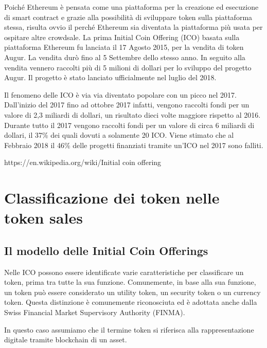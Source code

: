 Poiché Ethereum è pensata come una piattaforma per la creazione ed esecuzione di smart contract e grazie alla possibilità di sviluppare token sulla piattaforma stessa, risulta ovvio il perché Ethereum sia diventata la piattaforma più usata per ospitare altre crowdsale. La prima Initial Coin Offering (ICO) basata sulla piattaforma Ethereum fu lanciata il 17 Agosto 2015, per la vendita di token Augur. La vendita durò fino al 5 Settembre dello stesso anno. In seguito alla vendita vennero raccolti più di 5 milioni di dollari per lo sviluppo del progetto Augur. Il progetto è stato lanciato ufficialmente nel luglio del 2018. 

Il fenomeno delle ICO è via via diventato popolare con un picco nel 2017. Dall'inizio  del 2017 fino ad ottobre 2017 infatti,  vengono raccolti fondi per un valore di 2,3 miliardi di dollari, un risultato dieci volte maggiore rispetto al 2016. 
Durante tutto il 2017 vengono raccolti fondi per un valore di circa 6 miliardi di dollari, il 37\% dei quali dovuti a solamente 20 ICO. 
Viene stimato che al Febbraio 2018 il 46\% delle progetti finanziati tramite un'ICO nel 2017 sono falliti. 
 
https://en.wikipedia.org/wiki/Initial coin offering

\section{Classificazione dei token nelle token sales}
\subsection{Il modello delle Initial Coin Offerings}
Nelle ICO possono essere identificate varie caratteristiche per classificare un token, prima tra tutte la sua funzione. Comunemente, in base alla sua funzione, un token può essere considerato un utility token, un security token o un currency token. Questa distinzione è comunemente riconosciuta ed è adottata anche dalla Swiss Financial Market Supervisory Authority (FINMA). 

In questo caso assumiamo che il termine token si riferisca alla rappresentazione digitale tramite blockchain di un asset.

